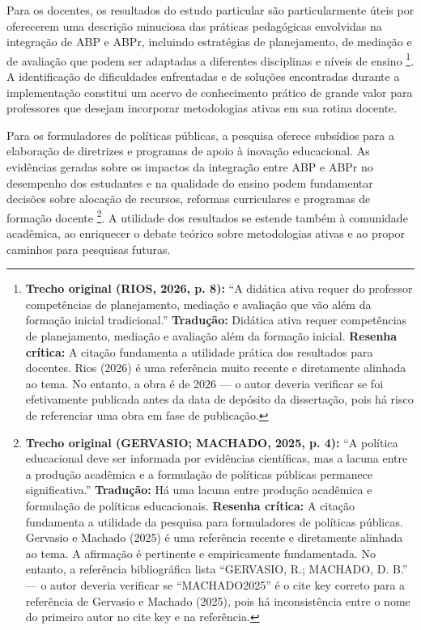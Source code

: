 Para os docentes, os resultados do estudo particular são particularmente úteis por oferecerem uma descrição minuciosa das práticas pedagógicas envolvidas na integração de ABP e ABPr, incluindo estratégias de planejamento, de mediação e de avaliação que podem ser adaptadas a diferentes disciplinas e níveis de ensino \cite{RIOS2026}\footnote{\textbf{Trecho original (RIOS, 2026, p. 8):} ``A didática ativa requer do professor competências de planejamento, mediação e avaliação que vão além da formação inicial tradicional.'' \textbf{Tradução:} Didática ativa requer competências de planejamento, mediação e avaliação além da formação inicial. \textbf{Resenha crítica:} A citação fundamenta a utilidade prática dos resultados para docentes. Rios (2026) é uma referência muito recente e diretamente alinhada ao tema. No entanto, a obra é de 2026 — o autor deveria verificar se foi efetivamente publicada antes da data de depósito da dissertação, pois há risco de referenciar uma obra em fase de publicação.}. A identificação de dificuldades enfrentadas e de soluções encontradas durante a implementação constitui um acervo de conhecimento prático de grande valor para professores que desejam incorporar metodologias ativas em sua rotina docente.

Para os formuladores de políticas públicas, a pesquisa oferece subsídios para a elaboração de diretrizes e programas de apoio à inovação educacional. As evidências geradas sobre os impactos da integração entre ABP e ABPr no desempenho dos estudantes e na qualidade do ensino podem fundamentar decisões sobre alocação de recursos, reformas curriculares e programas de formação docente \cite{MACHADO2025}\footnote{\textbf{Trecho original (GERVASIO; MACHADO, 2025, p. 4):} ``A política educacional deve ser informada por evidências científicas, mas a lacuna entre a produção acadêmica e a formulação de políticas públicas permanece significativa.'' \textbf{Tradução:} Há uma lacuna entre produção acadêmica e formulação de políticas educacionais. \textbf{Resenha crítica:} A citação fundamenta a utilidade da pesquisa para formuladores de políticas públicas. Gervasio e Machado (2025) é uma referência recente e diretamente alinhada ao tema. A afirmação é pertinente e empiricamente fundamentada. No entanto, a referência bibliográfica lista ``GERVASIO, R.; MACHADO, D. B.'' — o autor deveria verificar se ``MACHADO2025'' é o cite key correto para a referência de Gervasio e Machado (2025), pois há inconsistência entre o nome do primeiro autor no cite key e na referência.}. A utilidade dos resultados se estende também à comunidade acadêmica, ao enriquecer o debate teórico sobre metodologias ativas e ao propor caminhos para pesquisas futuras.

